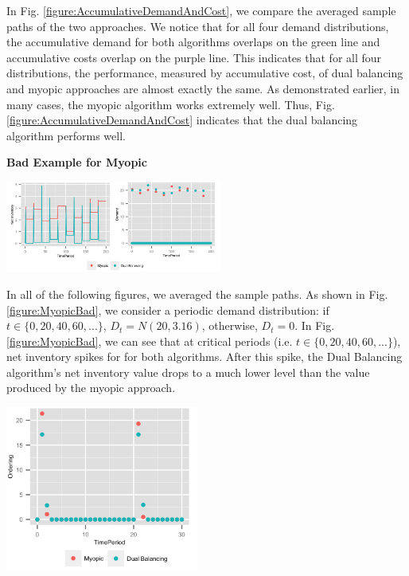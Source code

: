 \documentclass[twoside]{article}
\begin{document}
\begin{multicols}{2}
In Fig. \ref{figure:AccumulativeDemandAndCost}, we compare the averaged sample paths of the two approaches. We notice that for all four demand distributions, the accumulative demand for both algorithms overlaps on the green line and accumulative costs overlap on the purple line. This indicates that for all four distributions, the performance, measured by accumulative cost, of dual balancing and myopic approaches are almost exactly the same. As demonstrated earlier\cite{CLAcha1}, in many cases, the myopic algorithm works extremely well. Thus, Fig. \ref{figure:AccumulativeDemandAndCost} indicates that the dual balancing algorithm performs well.
  \begin{center}
    \textbf{Bad Example for Myopic}
  \end{center}
  \begin{center}
    \label{figure:MyopicBad}
    \includegraphics[width=2.8in]{figures/MyopicBad.png}
  \end{center}
  In all of the following figures, we averaged the sample paths. As shown in Fig. \ref{figure:MyopicBad}, we consider a periodic demand distribution: if $t\in \{0,20,40,60,...\}$, $D_t=N(20,3.16)$, otherwise, $D_t=0$.  In Fig. \ref{figure:MyopicBad}, we can see that at critical periods (i.e. $t\in \{0,20,40,60,...\}$), net inventory spikes for for both algorithms. After this spike, the Dual Balancing algorithm's net inventory value drops to a much lower level than the value produced by the myopic approach.
  \begin{center}
    \label{figure:MyopicBadOrderingWriteup}
    \includegraphics[width=2.5in]{figures/MyopicBadOrderingWriteup.png}

\end{center}
\end{multicols}
\end{document}

